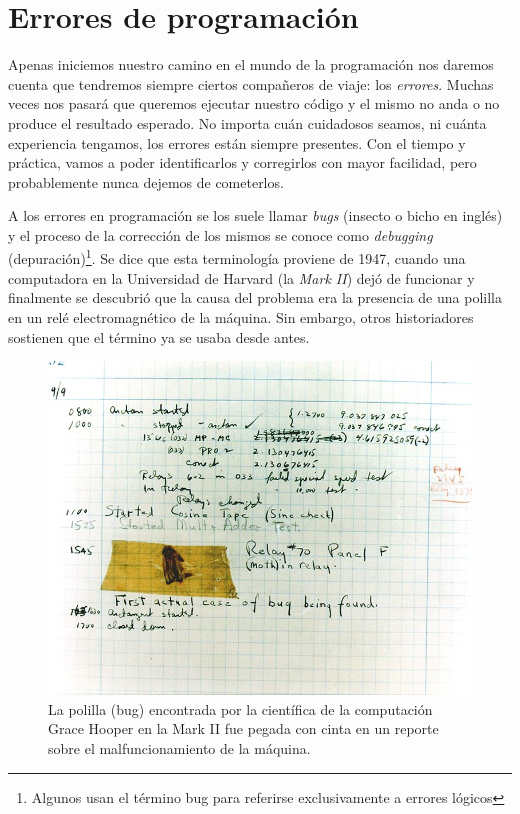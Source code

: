 \documentclass[
]{book}
\begin{document}
\hypertarget{errores-de-programaciuxf3n}{%
\section{Errores de programación}\label{errores-de-programaciuxf3n}}

Apenas iniciemos nuestro camino en el mundo de la programación nos daremos cuenta que tendremos siempre ciertos compañeros de viaje: los \emph{errores}. Muchas veces nos pasará que queremos ejecutar nuestro código y el mismo no anda o no produce el resultado esperado. No importa cuán cuidadosos seamos, ni cuánta experiencia tengamos, los errores están siempre presentes. Con el tiempo y práctica, vamos a poder identificarlos y corregirlos con mayor facilidad, pero probablemente nunca dejemos de cometerlos.

A los errores en programación se los suele llamar \emph{bugs} (insecto o bicho en inglés) y el proceso de la corrección de los mismos se conoce como \emph{debugging} (depuración)\footnote{Algunos usan el término bug para referirse exclusivamente a errores lógicos}. Se dice que esta terminología proviene de 1947, cuando una computadora en la Universidad de Harvard (la \emph{Mark II}) dejó de funcionar y finalmente se descubrió que la causa del problema era la presencia de una polilla en un relé electromagnético de la máquina. Sin embargo, otros historiadores sostienen que el término ya se usaba desde antes.

\begin{figure}

{\centering \includegraphics[width=0.7\linewidth]{images/intro/First_Computer_Bug} 

}

\caption{La polilla (bug) encontrada por la científica de la computación Grace Hooper en la Mark II fue pegada con cinta en un reporte sobre el malfuncionamiento de la máquina.}\label{fig:unnamed-chunk-6}
\end{figure}
\end{document}
